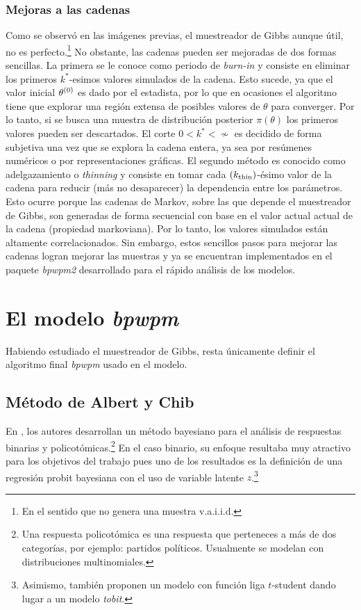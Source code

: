 \documentclass[../Main/Main.tex]{subfiles}
\begin{document}
\subsubsection*{Mejoras a las cadenas}
Como se observó en las imágenes previas, el muestreador de Gibbs aunque útil, no es perfecto.\footnote{En el sentido que no genera una muestra v.a.i.i.d.} No obstante, las cadenas pueden ser mejoradas de dos formas sencillas. La primera se le conoce como periodo de \textit{burn-in} y consiste en eliminar los primeros $k^*$-esimos valores simulados de la cadena. Esto sucede, ya que el valor inicial $\theta^{(0)}$ es dado por el estadista, por lo que en ocasiones el algoritmo tiene que explorar una región extensa de posibles valores de $\theta$ para converger. Por lo tanto, si se busca una muestra de distribución posterior $\pi(\theta)$ los primeros valores pueden ser descartados. El corte $0<k^*<\nsim$ es decidido de forma subjetiva una vez que se explora la cadena entera, ya sea por resúmenes numéricos o por representaciones gráficas. El segundo método es conocido como adelgazamiento o \textit{thinning} y consiste en tomar cada $(k_{\text{thin}})$-ésimo valor de la cadena para reducir (más no desaparecer) la dependencia entre los parámetros. Esto ocurre porque las cadenas de Markov, sobre las que depende el muestreador de Gibbs, son generadas de forma secuencial con base en el valor actual actual de la cadena (propiedad markoviana). Por lo tanto, los valores simulados están altamente correlacionados. Sin embargo, estos sencillos pasos para mejorar las cadenas logran mejorar las muestras y ya se encuentran implementados en el paquete \textit{bpwpm2} desarrollado para el rápido análisis de los modelos. 

\section{El modelo \textit{bpwpm}} 
Habiendo estudiado el muestreador de Gibbs, resta únicamente definir el algoritmo final \textit{bpwpm} usado en el modelo.

\subsection*{Método de Albert y Chib} \label{sec:AlbertChib}
En \citet{albert1993bayesian}, los autores desarrollan un método bayesiano para el análisis de respuestas binarias y policotómicas.\footnote{Una respuesta policotómica es una respuesta que perteneces a más de dos categorías, por ejemplo: partidos políticos. Usualmente se modelan con distribuciones multinomiales.} En el caso binario, su enfoque resultaba muy atractivo para los objetivos del trabajo pues uno de los resultados es la definición de una regresión probit bayesiana con el uso de variable latente $z$.\footnote{Asimismo, \citeauthor{albert1993bayesian} también proponen un modelo con función liga $t$-student dando lugar a un modelo \textit{tobit}.} 
\end{document}
